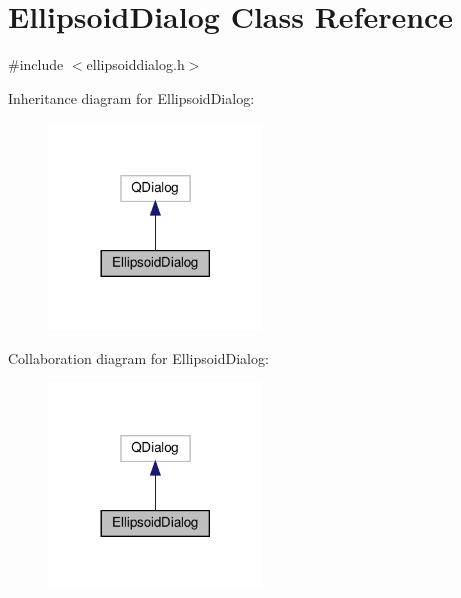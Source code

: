 \hypertarget{class_ellipsoid_dialog}{}\section{Ellipsoid\+Dialog Class Reference}
\label{class_ellipsoid_dialog}


{\ttfamily \#include $<$ellipsoiddialog.\+h$>$}



Inheritance diagram for Ellipsoid\+Dialog\+:
\nopagebreak
\begin{figure}[H]
\begin{center}
\leavevmode
\includegraphics[width=161pt]{class_ellipsoid_dialog__inherit__graph}
\end{center}
\end{figure}


Collaboration diagram for Ellipsoid\+Dialog\+:
\nopagebreak
\begin{figure}[H]
\begin{center}
\leavevmode
\includegraphics[width=161pt]{class_ellipsoid_dialog__coll__graph}
\end{center}
\end{figure}
